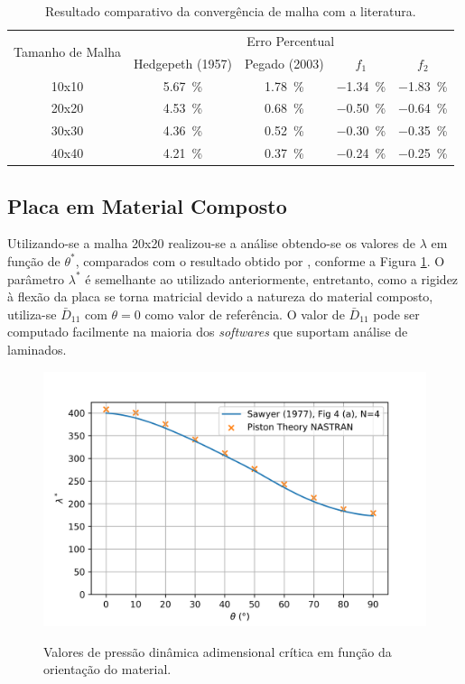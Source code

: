 \begin{table}[H]
\centering
\caption{Resultado comparativo da convergência de malha com a literatura.}
\begin{tabular}{|c|c|c|c|c|}
\hline
\multirow{2}{*}{Tamanho de Malha} & \multicolumn{4}{c|}{Erro Percentual}                 \\ \cline{2-5} 
                                  & Hedgepeth (1957) & Pegado (2003) & $f_1$   & $f_2$   \\ \hline
10x10                             & \SI{5.67}{\percent}           & \SI{1.78}{\percent}         & \SI{-1.34}{\percent}  & \SI{-1.83}{\percent}  \\ \hline
20x20                             & \SI{4.53}{\percent}           & \SI{0.68}{\percent}         & \SI{-0.50}{\percent}  & \SI{-0.64}{\percent}  \\ \hline
30x30                             & \SI{4.36}{\percent}           & \SI{0.52}{\percent}         & \SI{-0.30}{\percent}  & \SI{-0.35}{\percent}  \\ \hline
40x40                             & \SI{4.21}{\percent}           & \SI{0.37}{\percent}         & \SI{-0.24}{\percent}  & \SI{-0.25}{\percent}  \\ \hline
\end{tabular}
\label{tab-result-conv-comp}
\end{table}

\subsection{Placa em Material Composto}

Utilizando-se a malha 20x20 realizou-se a análise obtendo-se os 
valores de $\lambda$ em função de $\theta^*$, comparados com o 
resultado obtido por \cite{sawyer_flutter_1977}, conforme a Figura 
\ref{fig-result-comp}. O parâmetro $\lambda^*$ é semelhante ao 
utilizado anteriormente, entretanto, como a rigidez à flexão da 
placa se torna matricial devido a natureza do material composto, 
utiliza-se $\bar{D}_{11}$ com $\theta = 0$ como valor de referência.
O valor de $\bar{D}_{11}$ pode ser computado facilmente na maioria 
dos \emph{softwares} que suportam análise de laminados.

\begin{figure}[H]
\centering
\caption{Valores de pressão dinâmica adimensional crítica em função da orientação do material.}
\includegraphics[width=0.7\linewidth]{figures/reference-77.png}
\label{fig-result-comp}
\end{figure}

